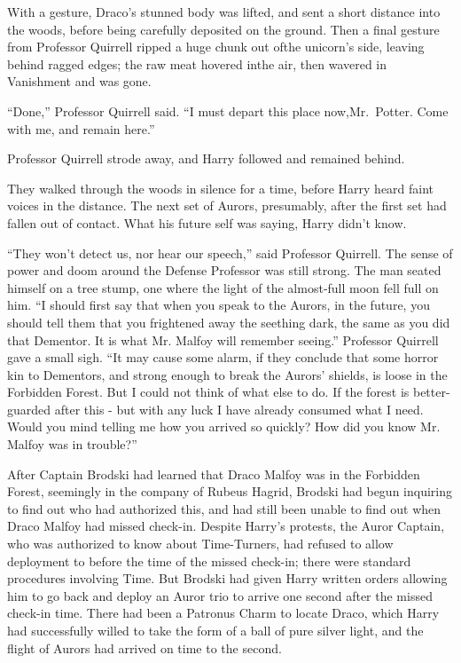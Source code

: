 With a gesture, Draco's stunned body was lifted, and sent a short distance into the woods, before being carefully deposited on the ground. Then a final gesture from Professor Quirrell ripped a huge chunk out ofthe unicorn's side, leaving behind ragged edges; the raw meat hovered inthe air, then wavered in Vanishment and was gone.

``Done,'' Professor Quirrell said. ``I must depart this place now,Mr.~Potter. Come with me, and remain here.''

Professor Quirrell strode away, and Harry followed and remained behind.

They walked through the woods in silence for a time, before Harry heard faint voices in the distance. The next set of Aurors, presumably, after the first set had fallen out of contact. What his future self was saying, Harry didn't know.

``They won't detect us, nor hear our speech,'' said Professor Quirrell. The sense of power and doom around the Defense Professor was still strong. The man seated himself on a tree stump, one where the light of the almost-full moon fell full on him. ``I should first say that when you speak to the Aurors, in the future, you should tell them that you frightened away the seething dark, the same as you did that Dementor. It is what Mr. Malfoy will remember seeing.'' Professor Quirrell gave a small sigh. ``It may cause some alarm, if they conclude that some horror kin to Dementors, and strong enough to break the Aurors' shields, is loose in the Forbidden Forest. But I could not think of what else to do. If the forest is better-guarded after this - but with any luck I have already consumed what I need. Would you mind telling me how you arrived so quickly? How did you know Mr. Malfoy was in trouble?''

After Captain Brodski had learned that Draco Malfoy was in the Forbidden Forest, seemingly in the company of Rubeus Hagrid, Brodski had begun inquiring to find out who had authorized this, and had still been unable to find out when Draco Malfoy had missed check-in. Despite Harry's protests, the Auror Captain, who was authorized to know about Time-Turners, had refused to allow deployment to before the time of the missed check-in; there were standard procedures involving Time. But Brodski had given Harry written orders allowing him to go back and deploy an Auror trio to arrive one second after the missed check-in time. There had been a Patronus Charm to locate Draco, which Harry had successfully willed to take the form of a ball of pure silver light, and the flight of Aurors had arrived on time to the second.

